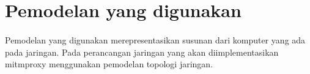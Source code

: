 \documentclass[./bab_3.tex]{subfiles}
\begin{document}
  \section{Pemodelan yang digunakan}
  \paragraph*{}Pemodelan yang digunakan merepresentasikan
  susunan dari komputer yang ada pada jaringan. Pada
  perancangan jaringan yang akan diimplementasikan mitmproxy
  menggunakan pemodelan topologi jaringan.
\end{document}
